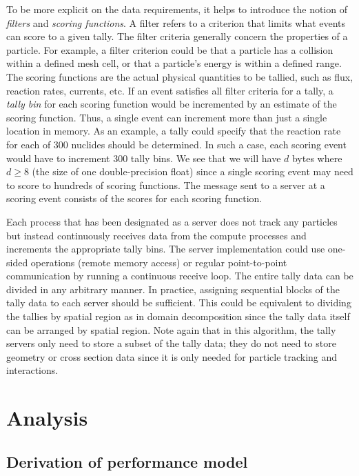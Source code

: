 \documentclass[3p,fleqn]{elsarticle}
\begin{document}
To be more explicit on the data requirements, it helps to introduce the notion
of \emph{filters} and \emph{scoring functions}. A filter refers to a criterion
that limits what events can score to a given tally.  The filter criteria
generally concern the properties of a particle. For example, a filter criterion
could be that a particle has a collision within a defined mesh cell, or that a
particle's energy is within a defined range. The scoring functions are the
actual physical quantities to be tallied, such as flux, reaction rates,
currents, etc. If an event satisfies all filter criteria for a tally, a
\emph{tally bin} for each scoring function would be incremented by an estimate
of the scoring function. Thus, a single event can increment more than just a
single location in memory. As an example, a tally could specify that the
reaction rate for each of 300 nuclides should be determined. In such a case,
each scoring event would have to increment 300 tally bins. We see that we will
have $d$ bytes where $d \ge 8$ (the size of one double-precision float) since a
single scoring event may need to score to hundreds of scoring functions. The
message sent to a server at a scoring event consists of the scores for each
scoring function.

Each process that has been designated as a server does not track any particles
but instead continuously receives data from the compute processes and increments
the appropriate tally bins. The server implementation could use one-sided
operations (remote memory access) or regular point-to-point communication by
running a continuous receive loop. The entire tally data can be divided in any
arbitrary manner. In practice, assigning sequential blocks of the tally data to
each server should be sufficient. This could be equivalent to dividing the
tallies by spatial region as in domain decomposition since the tally data itself
can be arranged by spatial region. Note again that in this algorithm, the tally
servers only need to store a subset of the tally data; they do not need to store
geometry or cross section data since it is only needed for particle tracking and
interactions.

\section{Analysis}
\label{sec:analysis}

\subsection{Derivation of performance model}
\end{document}
